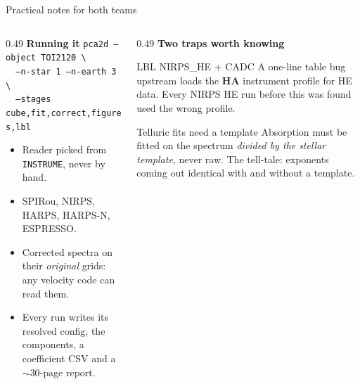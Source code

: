 \documentclass[aspectratio=169,11pt]{beamer}
\begin{document}
\begin{frame}{Practical notes for both teams}

  \begin{columns}[T]
    \begin{column}{0.49\textwidth}
      \textbf{Running it}
      \vspace{0.3em}
      \footnotesize
      \texttt{pca2d --object TOI2120 \textbackslash}\\
      \texttt{\ \ --n-star 1 --n-earth 3 \textbackslash}\\
      \texttt{\ \ --stages cube,fit,correct,figures,lbl}

      \vspace{0.6em}
      \normalsize
      \begin{itemize}\small
        \item Reader picked from \texttt{INSTRUME}, never by hand.
        \item SPIRou, NIRPS, HARPS, HARPS-N, ESPRESSO.
        \item Corrected spectra on their \emph{original} grids: any velocity
          code can read them.
        \item Every run writes its resolved config, the components, a
          coefficient CSV and a $\sim$30-page report.
      \end{itemize}
    \end{column}
    \begin{column}{0.49\textwidth}
      \textbf{Two traps worth knowing}
      \vspace{0.4em}
      \begin{alertblock}{\small LBL NIRPS\_HE + CADC}
        \small
        A one-line table bug upstream loads the \textbf{HA} instrument
        profile for HE data. Every NIRPS HE run before this was found used
        the wrong profile.
      \end{alertblock}
      \begin{alertblock}{\small Telluric fits need a template}
        \small
        Absorption must be fitted on the spectrum \emph{divided by the
        stellar template}, never raw. The tell-tale: exponents coming out
        identical with and without a template.
      \end{alertblock}
    \end{column}
  \end{columns}
\end{frame}
\end{document}
